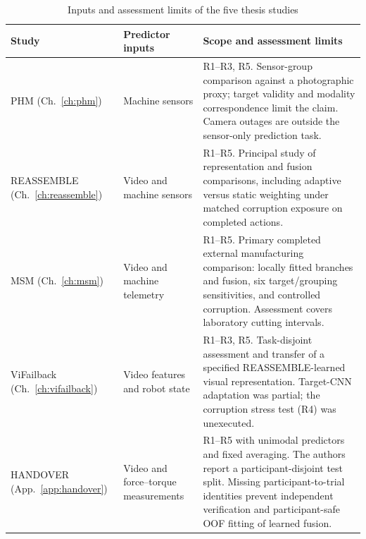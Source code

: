 \begin{table}[htbp]
  \centering
  \caption{Inputs and assessment limits of the five thesis studies}
  \label{tab:fusion-study-scope}
  \begingroup
  \singlespacing\small
  \setlength{\tabcolsep}{4pt}
  \renewcommand{\arraystretch}{1.28}
  \begin{tabularx}{\linewidth}{@{}P{.22\linewidth} P{.23\linewidth} Y@{}}
    \toprule
    \textbf{Study} & \textbf{Predictor inputs} & \textbf{Scope and assessment limits}\\
    \midrule
    PHM (Ch.~\ref{ch:phm})
      & Machine sensors
      & R1--R3, R5. Sensor-group comparison against a photographic proxy;
        target validity and modality correspondence limit the claim.
        Camera outages are outside the sensor-only prediction task.\\
    REASSEMBLE (Ch.~\ref{ch:reassemble})
      & Video and machine sensors
      & R1--R5. Principal study of representation and fusion comparisons,
        including adaptive versus static weighting under matched corruption
        exposure on completed actions.\\
    MSM (Ch.~\ref{ch:msm})
      & Video and machine telemetry
      & R1--R5. Primary completed external manufacturing comparison:
        locally fitted branches and fusion, six target/grouping sensitivities,
        and controlled corruption. Assessment covers laboratory cutting intervals.\\
    ViFailback (Ch.~\ref{ch:vifailback})
      & Video features and robot state
      & R1--R3, R5. Task-disjoint assessment and transfer of a specified
        REASSEMBLE-learned visual representation. Target-CNN adaptation was
        partial; the corruption stress test (R4) was unexecuted.\\
    HANDOVER (App.~\ref{app:handover})
      & Video and force--torque measurements
      & R1--R5 with unimodal predictors and fixed averaging. The authors report
        a participant-disjoint test split. Missing participant-to-trial identities
        prevent independent verification and participant-safe OOF fitting of
        learned fusion.\\
    \bottomrule
  \end{tabularx}
  \endgroup
\end{table}

